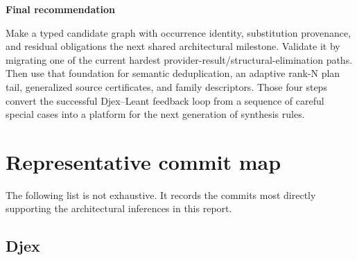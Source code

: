 \documentclass[11pt]{article}
\newenvironment{recommendation}[1]
{\par\medskip\noindent\colorbox{GoodBg}{\parbox{\dimexpr\linewidth-2\fboxsep\relax}{\sffamily\bfseries #1}}\par\smallskip}
{\par\medskip}
\begin{document}
\begin{recommendation}{Final recommendation}
Make a typed candidate graph with occurrence identity, substitution provenance,
and residual obligations the next shared architectural milestone.  Validate it
by migrating one of the current hardest provider-result/structural-elimination
paths.  Then use that foundation for semantic deduplication, an adaptive rank-N
plan tail, generalized source certificates, and family descriptors.  Those four
steps convert the successful Djex--Leant feedback loop from a sequence of
careful special cases into a platform for the next generation of synthesis
rules.
\end{recommendation}

\appendix

\section{Representative commit map}
\label{app:commits}

The following list is not exhaustive.  It records the commits most directly
supporting the architectural inferences in this report.

\subsection{Djex}
\end{document}
